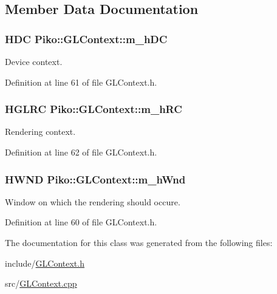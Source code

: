 \subsection{Member Data Documentation}
\hypertarget{class_piko_1_1_g_l_context_a394104e4ba6c80adb3faee26251bd5bc}{
\subsubsection[{m\-\_\-h\-D\-C}]{\setlength{\rightskip}{0pt plus 5cm}H\-D\-C Piko\-::\-G\-L\-Context\-::m\-\_\-h\-D\-C\hspace{0.3cm}{\ttfamily [private]}}}\label{de/d00/class_piko_1_1_g_l_context_a394104e4ba6c80adb3faee26251bd5bc}
Device context. 

Definition at line 61 of file G\-L\-Context.\-h.

\hypertarget{class_piko_1_1_g_l_context_ab0232beca7b587ce3ede831d445d538d}{
\subsubsection[{m\-\_\-h\-R\-C}]{\setlength{\rightskip}{0pt plus 5cm}H\-G\-L\-R\-C Piko\-::\-G\-L\-Context\-::m\-\_\-h\-R\-C\hspace{0.3cm}{\ttfamily [private]}}}\label{de/d00/class_piko_1_1_g_l_context_ab0232beca7b587ce3ede831d445d538d}
Rendering context. 

Definition at line 62 of file G\-L\-Context.\-h.

\hypertarget{class_piko_1_1_g_l_context_ae10ea9016ac413c4c8ecba207eacc9ff}{
\subsubsection[{m\-\_\-h\-Wnd}]{\setlength{\rightskip}{0pt plus 5cm}H\-W\-N\-D Piko\-::\-G\-L\-Context\-::m\-\_\-h\-Wnd\hspace{0.3cm}{\ttfamily [private]}}}\label{de/d00/class_piko_1_1_g_l_context_ae10ea9016ac413c4c8ecba207eacc9ff}
Window on which the rendering should occure. 

Definition at line 60 of file G\-L\-Context.\-h.



The documentation for this class was generated from the following files\-:\begin{DoxyCompactItemize}
\item 
include/\hyperlink{_g_l_context_8h}{G\-L\-Context.\-h}\item 
src/\hyperlink{_g_l_context_8cpp}{G\-L\-Context.\-cpp}\end{DoxyCompactItemize}
